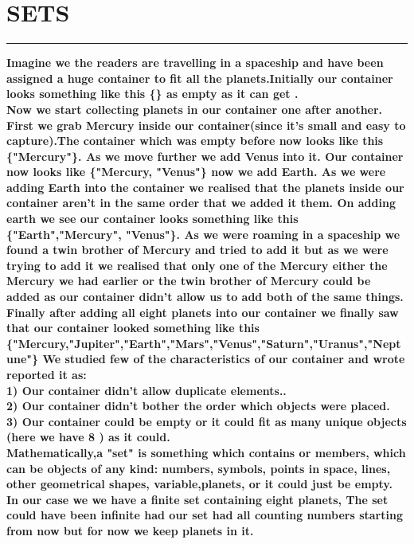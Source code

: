 \documentclass{article}
\begin{document}
\section*{SETS}
\hrule 
\bigskip
\textbf{Imagine we the readers are travelling in a spaceship and  have been assigned a huge container  to fit all the planets.Initially our container looks something like this \{\} as empty as it can get . 
\\
Now we start collecting planets in our container one after another. First we grab Mercury inside our container(since it's small and easy to capture).The container which was empty before now looks like this \{"Mercury"\}. As we move further we add Venus into it. Our container now looks like \{"Mercury, "Venus"\} now we add Earth. 
As we were adding Earth into the container we realised that the planets inside our container aren't in the same order that we added it them. On adding earth we see our container looks something like this \{"Earth","Mercury", "Venus"\}. As we were roaming in a spaceship we found a twin brother of Mercury and tried to add it but as we were trying to add it we realised that only one of the Mercury either the Mercury we had earlier or the twin brother of Mercury could be added as our container didn't allow us to add both of the same things.  Finally after  adding all eight planets into our container we finally saw that our container looked something like this 
\{"Mercury,"Jupiter","Earth","Mars","Venus","Saturn","Uranus","Neptune"\}
We studied few of the characteristics of our container and wrote reported it as:
\\ 1) Our container didn't allow duplicate elements..
\\ 2) Our container didn't bother the order which objects were placed.
\\ 3) Our container could be empty or it could fit as many unique objects (here we have 8 ) as it could.\\Mathematically,a "set" is something which contains or members, which can be  objects of any kind: numbers, symbols, points in space, lines, other geometrical shapes, variable,planets, or it could just be empty. In our case we we have a finite set containing eight planets, The set could have been infinite had our set had all counting numbers starting from now but for now we keep planets in it.}

\pagebreak 
\end{document}
